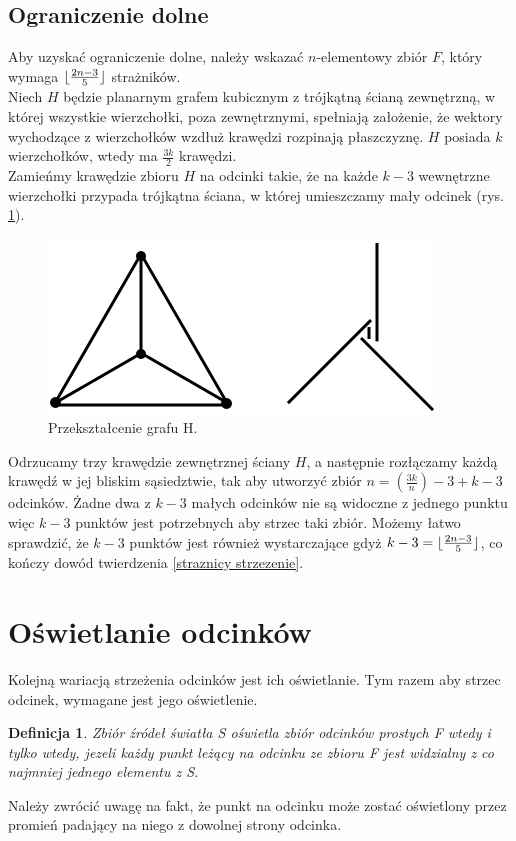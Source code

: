\documentclass[brudnopis]{xmgr}
\DeclarePairedDelimiter\floor{\lfloor}{\rfloor}
\newtheorem{Definicja}{Definicja} \theoremstyle{definition}
\begin{document}
\subsection{Ograniczenie dolne}
\indent Aby uzyskać ograniczenie dolne, należy wskazać $n$-elementowy zbiór $F$, który wymaga $\floor{\frac{2n-3}{5}}$ strażników.
\\\indent Niech $H$ będzie planarnym grafem kubicznym z trójkątną ścianą zewnętrzną, w której wszystkie wierzchołki, poza zewnętrznymi, spełniają założenie, że wektory wychodzące z wierzchołków wzdłuż krawędzi rozpinają płaszczyznę. $H$ posiada $k$ wierzchołków, wtedy ma $\frac{3k}{2}$ krawędzi.
\\\indent Zamieńmy krawędzie zbioru $H$ na odcinki takie, że na każde $k - 3$ wewnętrzne wierzchołki przypada trójkątna ściana, w której umieszczamy mały odcinek (rys. \ref{fig:przeksztalcenie h}).
\begin{figure}[ht!]
 \centering
  \includegraphics{rysunki/dolna_granica.png}
  \caption{Przekształcenie grafu H.}
  \label{fig:przeksztalcenie h}
\end{figure} 
Odrzucamy trzy krawędzie zewnętrznej ściany $H$, a następnie rozłączamy każdą krawędź w jej bliskim sąsiedztwie, tak aby utworzyć zbiór $n = (\frac{3k}{n}) - 3 + k  - 3$ odcinków. Żadne dwa z $k - 3$ małych odcinków nie są widoczne z jednego punktu więc $k - 3$ punktów jest potrzebnych aby strzec taki zbiór. Możemy łatwo sprawdzić, że $k - 3$ punktów jest również wystarczające gdyż $k - 3 = \floor{\frac{2n - 3}{5}}$, co kończy dowód twierdzenia \ref{straznicy strzezenie}.

\section{Oświetlanie odcinków}\label{oświetlanie odcinków}
Kolejną wariacją strzeżenia odcinków jest ich oświetlanie. Tym razem aby strzec odcinek, wymagane jest jego oświetlenie.
\begin{Definicja}
	Zbiór źródeł światła S \textnormal{oświetla} zbiór odcinków prostych F wtedy i tylko wtedy, jezeli każdy punkt leżący na odcinku ze zbioru F \textnormal{jest widzialny} z co najmniej jednego elementu z S.
\end{Definicja} Należy zwrócić uwagę na fakt, że punkt na odcinku może zostać oświetlony przez promień padający na niego z dowolnej strony odcinka.
\end{document}
